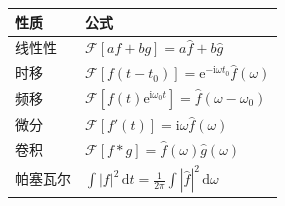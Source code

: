 \begin{table}[htbp]
\centering
\begin{tabular}{ll}
\toprule
\textbf{性质} & \textbf{公式} \\
\midrule
线性性 & $\mathcal{F}[af + bg] = a\hat{f} + b\hat{g}$ \\
时移 & $\mathcal{F}[f(t-t_0)] = \mathrm{e}^{-\mathrm{i}\omega t_0}\hat{f}(\omega)$ \\
频移 & $\mathcal{F}[f(t)\mathrm{e}^{\mathrm{i}\omega_0 t}] = \hat{f}(\omega-\omega_0)$ \\
微分 & $\mathcal{F}[f'(t)] = \mathrm{i}\omega\hat{f}(\omega)$ \\
卷积 & $\mathcal{F}[f * g] = \hat{f}(\omega)\hat{g}(\omega)$ \\
帕塞瓦尔 & $\int |f|^2\,\mathrm{d}t = \frac{1}{2\pi}\int |\hat{f}|^2\,\mathrm{d}\omega$ \\
\bottomrule
\end{tabular}
\end{table}
